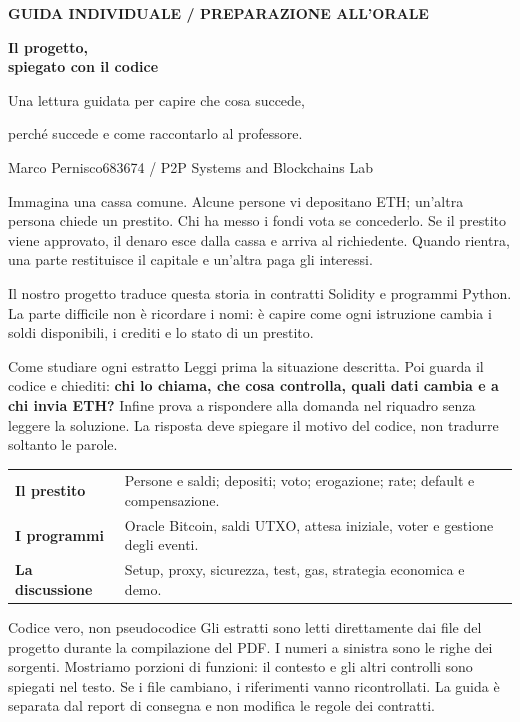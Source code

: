 \documentclass[10pt,a4paper]{article}
\newcommand{\lead}[1]{\par\vspace{2mm}{\large\bfseries\color{Navy}#1\par}\vspace{0.5mm}}
\begin{document}
{\small\bfseries\color{Teal}GUIDA INDIVIDUALE / PREPARAZIONE ALL'ORALE}\par
\vspace{5mm}
{\fontsize{31}{35}\selectfont\bfseries\color{Navy}Il progetto,\\spiegato con il codice\par}
\vspace{4mm}
{\Large Una lettura guidata per capire che cosa succede,\par
perché succede e come raccontarlo al professore.\par}
\vspace{3mm}
Marco Pernisco\quad\textcolor{Muted}{683674 / P2P Systems and Blockchains Lab}

\lead{Da dove partiamo}
Immagina una cassa comune. Alcune persone vi depositano ETH; un'altra persona
chiede un prestito. Chi ha messo i fondi vota se concederlo. Se il prestito viene
approvato, il denaro esce dalla cassa e arriva al richiedente. Quando rientra,
una parte restituisce il capitale e un'altra paga gli interessi.

Il nostro progetto traduce questa storia in contratti Solidity e programmi
Python. La parte difficile non è ricordare i nomi: è capire come ogni istruzione
cambia i soldi disponibili, i crediti e lo stato di un prestito.

\begin{keybox}{Come studiare ogni estratto}
Leggi prima la situazione descritta. Poi guarda il codice e chiediti:
\textbf{chi lo chiama, che cosa controlla, quali dati cambia e a chi invia ETH?}
Infine prova a rispondere alla domanda nel riquadro senza leggere la soluzione.
La risposta deve spiegare il motivo del codice, non tradurre soltanto le parole.
\end{keybox}

\lead{Tre percorsi di lettura}
\begin{tabularx}{\linewidth}{@{}>{\bfseries}p{24mm}X@{}}
\toprule
Il prestito & Persone e saldi; depositi; voto; erogazione; rate; default e compensazione.\\
I programmi & Oracle Bitcoin, saldi UTXO, attesa iniziale, voter e gestione degli eventi.\\
La discussione & Setup, proxy, sicurezza, test, gas, strategia economica e demo.\\
\bottomrule
\end{tabularx}

\begin{warningbox}{Codice vero, non pseudocodice}
Gli estratti sono letti direttamente dai file del progetto durante la compilazione
del PDF. I numeri a sinistra sono le righe dei sorgenti. Mostriamo porzioni di
funzioni: il contesto e gli altri controlli sono spiegati nel testo. Se i file
cambiano, i riferimenti vanno ricontrollati. La guida è separata dal report di
consegna e non modifica le regole dei contratti.
\end{warningbox}
\end{document}
